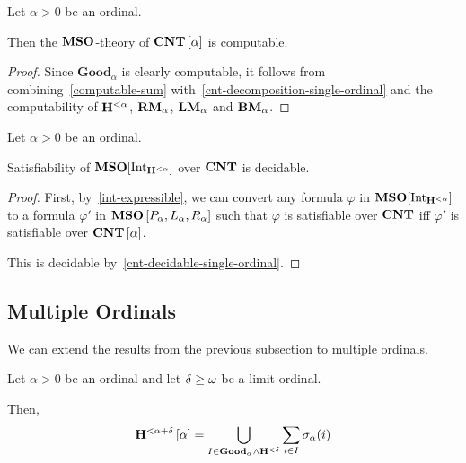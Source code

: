 \begin{lemma}\label{cnt-decidable-single-ordinal}
  Let $\alpha > 0$ be an ordinal.

  Then the $\mathbf{MSO}$-theory of $\mathbf{CNT} \left[ {\alpha} \right]$ is computable.
\end{lemma}

\begin{proof}
  Since $\mathbf{Good}_{\alpha}$ is clearly computable,
  it follows from combining~\cref{computable-sum}
  with~\cref{cnt-decomposition-single-ordinal}
  and the computability of $\mathbf{H}^{< \alpha}$,
  $\mathbf{RM}_{\alpha}$, $\mathbf{LM}_{\alpha}$ and $\mathbf{BM}_{\alpha}$.
\end{proof}

\begin{theorem}\label{single-ordinal-satisfiability}
  Let $\alpha > 0$ be an ordinal.

  Satisfiability of $\mathbf{MSO}[\mathrm{Int}_{\mathbf{H}^{< \alpha}}]$
  over $\mathbf{CNT}$ is decidable.
\end{theorem}

\begin{proof}
  First, by~\cref{int-expressible}, we can convert
  any formula $\varphi$ in $\mathbf{MSO}[\mathrm{Int}_{\mathbf{H}^{< \alpha}}]$
  to a formula $\varphi'$ in $\mathbf{MSO} \left[ {P_\alpha, L_\alpha, R_\alpha} \right]$
  such that $\varphi$ is satisfiable over $\mathbf{CNT}$
  iff $\varphi'$ is satisfiable over $\mathbf{CNT} \left[ {\alpha} \right]$.

  This is decidable by~\cref{cnt-decidable-single-ordinal}.
\end{proof}

\subsection{Multiple Ordinals}
We can extend the results from the previous subsection to multiple ordinals.



\begin{lemma}\label{ho-decomposition-single-ordinal}
  Let $\alpha > 0$ be an ordinal
  and let $\delta \ge \omega$ be a limit ordinal.

  Then,
  \[
    \mathbf{H}^{< \alpha + \delta} \left[ {\alpha} \right] = \bigcup_{I \in \mathbf{Good}_{\alpha} \wedge \mathbf{H}^{< \delta}} \sum_{i \in I} \sigma_{\alpha}(i)
  \]

\end{lemma}

